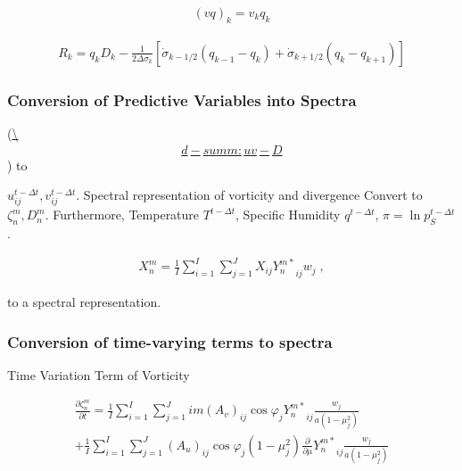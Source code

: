 \begin{eqnarray}
 (v q)_k  = v_k q_k
\end{eqnarray}

\begin{eqnarray}
R_k  =  q_k D_k
       - \frac{1}{2 \Delta \sigma_k}
             [   \dot{\sigma}_{k-1/2} ( q_{k-1} - q_k   )
               + \dot{\sigma}_{k+1/2} ( q_k   - q_{k+1} ) ]
\end{eqnarray}

\hypertarget{conversion-of-predictive-variables-into-spectra}{%
\subsubsection{Conversion of Predictive Variables into
Spectra}\label{conversion-of-predictive-variables-into-spectra}}

(\protect\hyperlink{d-summ:uv-D}{\textbackslash{}\d\begin{eqnarray}d-summ:uv-D\end{eqnarray}}) to

\(u_{ij}^{t-\Delta t}, v_{ij}^{t-\Delta t}\). Spectral representation of
vorticity and divergence Convert to \(\zeta_n^m, D_n^m\). Furthermore,
Temperature \(T^{t-\Delta t}\), Specific Humidity \(q^{t-\Delta t}\),
\(\pi = \ln p_S^{t-\Delta t}\).

\begin{eqnarray}
  X_n^m  =  \frac{1}{I} \sum_{i=1}^{I} \sum_{j=1}^{J}  
               X_{ij} {Y_n^{m *}}_{ij}  w_j \; ,
\end{eqnarray}

to a spectral representation.

\hypertarget{conversion-of-time-varying-terms-to-spectra}{%
\subsubsection{Conversion of time-varying terms to
spectra}\label{conversion-of-time-varying-terms-to-spectra}}

Time Variation Term of Vorticity

\begin{eqnarray}
  \frac{\partial \zeta_n^m}{\partial t}
   =  \frac{1}{I} \sum_{i=1}^{I} \sum_{j=1}^{J}  
          im (A_v)_{ij} \cos \varphi_j
          {Y_n^{m *}}_{ij}
         \frac{w_j}{a(1-\mu_j^{2})}
          \\
   +    \frac{1}{I} \sum_{i=1}^{I} \sum_{j=1}^{J}  
          (A_u)_{ij} \cos \varphi_j
          (1-\mu_j^2)
          \frac{\partial }{\partial \mu} {Y_n^{m *}}_{ij}
          \frac{w_j}{a(1-\mu_j^{2})}
          \\
\end{eqnarray}

